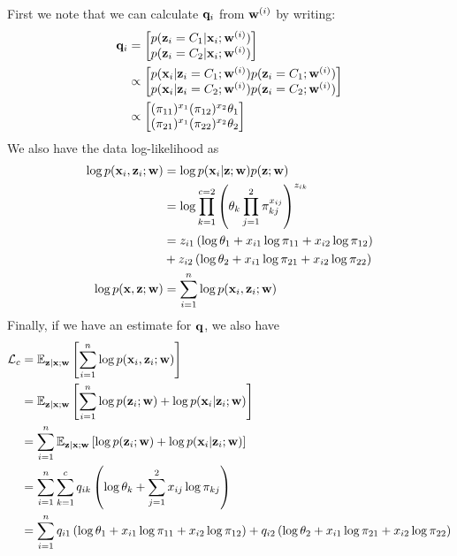 \documentclass[12pt,letterpaper]{article}
\begin{document}
\noindent First we note that we can calculate $\mathbf{q}_i$ from $\mathbf{w}^{(i)}$ by writing:
	\begin{align}
		\mathbf{q}_i &= \begin{bmatrix}p(\mathbf{z}_i = C_1 | \mathbf{x}_i; \mathbf{w}^{(i)}) \\ p(\mathbf{z}_i = C_2 | \mathbf{x}_i; \mathbf{w}^{(i)})\end{bmatrix} \\
		    &\propto \begin{bmatrix}p(\mathbf{x}_i | \mathbf{z}_i = C_1; \mathbf{w}^{(i)})p(\mathbf{z}_i = C_1; \mathbf{w}^{(i)}) \\ p(\mathbf{x}_i | \mathbf{z}_i = C_2; \mathbf{w}^{(i)})p(\mathbf{z}_i = C_2; \mathbf{w}^{(i)})\end{bmatrix} \\
			&\propto \begin{bmatrix}(\pi_{11})^{x_1}(\pi_{12})^{x_2}\theta_1\\ (\pi_{21})^{x_1}(\pi_{22})^{x_2}\theta_2\end{bmatrix}
	\end{align}
\noindent We also have the data log-likelihood as
	\begin{align}
	\log p(\mathbf{x}_i, \mathbf{z}_i; \mathbf{w}) &= \log p(\mathbf{x}_i | \mathbf{z}; \mathbf{w})p(\mathbf{z}; \mathbf{w})\\
	    &= \log \prod_{k = 1}^{c = 2}\left(\theta_k\prod_{j = 1}^{2}\pi_{kj}^{x_{ij}}\right)^{z_{ik}}\\
	    &= z_{i1}\left(\log\theta_1 + x_{i1}\log \pi_{11} + x_{i2}\log \pi_{12}\right) \\
	    &+ z_{i2}\left(\log\theta_2 + x_{i1}\log \pi_{21} + x_{i2}\log \pi_{22}\right) \\
    \log p(\mathbf{x}, \mathbf{z}; \mathbf{w}) &= \sum_{i = 1}^n \log p(\mathbf{x}_i, \mathbf{z}_i; \mathbf{w})
	\end{align}
Finally, if we have an estimate for $\mathbf{q}$, we also have
	\begin{align}
		\mathcal{L}_{c} &= \mathbb{E}_{\mathbf{z} | \mathbf{x} ; \mathbf{w}}\left[\sum_{i = 1}^n \log p(\mathbf{x}_i, \mathbf{z}_i; \mathbf{w})\right]\\
		&= \mathbb{E}_{\mathbf{z} | \mathbf{x} ; \mathbf{w}} \left[\sum_{i=1}^n\log p(\mathbf{z}_i ; \mathbf{w}) + \log p(\mathbf{x}_i | \mathbf{z}_i ; \mathbf{w}) \right] \\
		&= \sum_{i = 1}^n \mathbb{E}_{\mathbf{z} | \mathbf{x} ; \mathbf{w}} \left[ \log p(\mathbf{z}_i ; \mathbf{w}) + \log p(\mathbf{x}_i | \mathbf{z}_i ; \mathbf{w})\right]\\
		&= \sum_{i = 1}^n \sum_{k = 1}^c q_{ik}\left(\log \theta_k + \sum_{j = 1}^2 x_{ij} \log \pi_{kj}\right) \\
		&= \sum_{i = 1}^n q_{i1}\left(\log\theta_1 + x_{i1}\log \pi_{11} + x_{i2}\log \pi_{12}\right) + q_{i2}\left(\log\theta_2 + x_{i1}\log \pi_{21} + x_{i2}\log \pi_{22}\right)
	\end{align}
\end{document}
